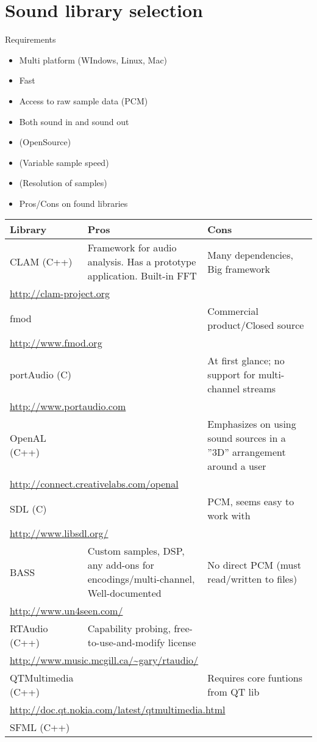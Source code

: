 \chapter{Sound library selection}
Requirements
\begin{itemize}
\item Multi platform (WIndows, Linux, Mac)
\item Fast
\item Access to raw sample data (PCM)
\item Both sound in and sound out
\item(OpenSource)
\item(Variable sample speed)
\item(Resolution of samples)
\item Pros/Cons on found libraries
\end{itemize}

\begin{table}
\centering
\begin{tabularx}{\textwidth}{lXX}
Library & Pros & Cons\\
\midrule
CLAM (C++) & Framework for audio analysis. Has a prototype application. Built-in FFT & Many dependencies, Big framework\\
\multicolumn{3}{l}{\url{http://clam-project.org}}\\
\midrule
fmod & & Commercial product/Closed source\\
\multicolumn{3}{l}{\url{http://www.fmod.org}}\\
\midrule
portAudio (C) & & At first glance; no support for multi-channel streams\\
\multicolumn{3}{l}{\url{http://www.portaudio.com}}\\
\midrule
OpenAL (C++)& & Emphasizes on using sound sources in a ''3D'' arrangement around a user\\
\multicolumn{3}{l}{\url{http://connect.creativelabs.com/openal}}\\
\midrule
SDL (C) & & PCM, seems easy to work with \\
\multicolumn{3}{l}{\url{http://www.libsdl.org/}}\\
\midrule
BASS & Custom samples, DSP,  any add-ons for encodings/multi-channel, Well-documented & No direct PCM (must read/written to files)\\
\multicolumn{3}{l}{\url{http://www.un4seen.com/}}\\
\midrule
RTAudio (C++) & Capability probing, free-to-use-and-modify license & \\
\multicolumn{3}{l}{\url{http://www.music.mcgill.ca/~gary/rtaudio/}}\\
\midrule
QTMultimedia (C++) & & Requires core funtions from QT lib\\
\multicolumn{3}{l}{\url{http://doc.qt.nokia.com/latest/qtmultimedia.html}}\\
\midrule
SFML (C++) & & 
\end{tabularx}
\end{table}